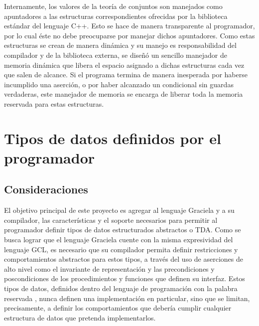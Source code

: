 {{Internamente, los valores de la teoría de conjuntos son manejados como
apuntadores a las estructuras correspondientes ofrecidas por la biblioteca
estándar del lenguaje C++. Esto se hace de manera transparente al programador,
por lo cual éste no debe preocuparse por manejar dichos apuntadores. Como  estas
estructuras se crean de manera dinámica y su manejo es responsabilidad del
compilador y de la biblioteca externa, se diseñó un sencillo manejador de
memoria dinámica que libera el espacio asignado a dichas estructuras cada vez
que salen de alcance. Si el programa termina de manera inesperada por haberse
incumplido una aserción, o por haber alcanzado un condicional sin guardas
verdaderas, este manejador de memoria se encarga de liberar toda la memoria
reservada para estas estructuras.

\section{Tipos de datos definidos por el programador}



\subsection{Consideraciones}

El objetivo principal de este proyecto es agregar al lenguaje Graciela y a su
compilador, las características y el soporte necesarios para permitir al
programador definir tipos de datos estructurados abstractos o TDA. Como se busca
lograr que el lenguaje Graciela cuente con la misma expresividad del lenguaje
GCL, es necesario que su compilador permita definir restricciones y
comportamientos abstractos para estos tipos, a través del uso de aserciones de
alto nivel como el invariante de representación y las precondiciones y
poscondiciones de los procedimientos y funciones que definen su interfaz.
Estos tipos de datos, definidos dentro del lenguaje de programación con la
palabra reservada , nunca definen una implementación en
particular, sino que se limitan, precisamente, a definir los comportamientos que
debería cumplir cualquier estructura de datos que pretenda implementarlos.

}}
